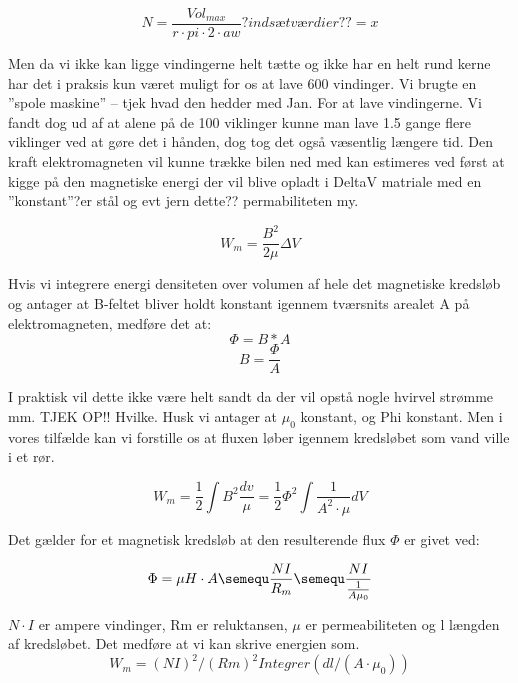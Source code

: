 \begin{equation}
N=\frac{Vol_{max}}{r \cdot pi \cdot 2 \cdot aw}  ?indsæt værdier?? = x
\end{equation}


Men da vi ikke kan ligge vindingerne helt tætte og ikke har en helt rund kerne har det i praksis kun været muligt for os at lave 600 vindinger.
Vi brugte en ”spole maskine” – tjek hvad den hedder med Jan. For at lave vindingerne. Vi fandt dog ud af at alene på de 100 viklinger kunne man lave 1.5 gange flere viklinger ved at gøre det i hånden, dog tog det også væsentlig længere tid.
Den kraft elektromagneten vil kunne trække bilen ned med kan estimeres ved først at kigge på den magnetiske energi der vil blive opladt i DeltaV matriale med  en ”konstant”?er stål  og evt jern dette?? permabiliteten my. 

\begin{equation}
W_m =\frac{B^2}{2 \mu} \Delta V
\end{equation}


Hvis vi integrere energi densiteten over volumen af hele det magnetiske kredsløb og antager at B-feltet bliver holdt konstant igennem tværsnits arealet A på elektromagneten, medføre det at:
\begin{equation}
\Phi=B*A
\end{equation}
\begin{equation}
B=\frac{\Phi}{A} 
\end{equation}


I praktisk vil dette ikke være helt sandt da der vil opstå nogle hvirvel strømme mm. TJEK OP!! Hvilke. Husk vi antager at $\mu_0$ konstant, og Phi konstant.  Men i vores tilfælde kan vi forstille os at fluxen løber igennem kredsløbet som vand ville i et rør.

\begin{equation}
W_m = \frac{1}{2} \int B^2 \frac{dv}{\mu}  = \frac{1}{2} \Phi^2 \int \frac{1}{A^2 \cdot \mu} dV
\end{equation}

Det gælder for et magnetisk kredsløb at den resulterende flux $\Phi$ er givet ved:

\begin{equation}
\Phi=\mu H \cdot A  \semequ \frac{NI}{R_m} \semequ  \frac{NI}{\frac{1}{A\mu_0}}
\end{equation}

$N \cdot I$ er ampere vindinger, Rm er reluktansen, $ \mu $ er permeabiliteten og l længden af kredsløbet. Det medføre at vi kan skrive energien som.
\begin{equation}
W_m = (NI)^2/(Rm)^2 Integrer (dl/(A \cdot \mu_0))
\end{equation}


